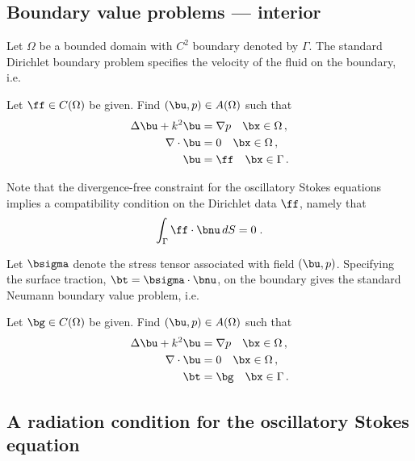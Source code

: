 \subsection{Boundary value problems --- interior}

Let $\Omega$ be a bounded domain with $C^2$ boundary
denoted by $\Gamma$.
The standard Dirichlet boundary problem specifies the
velocity of the fluid on the boundary, i.e.

\begin{definition}
  Let $\ff \in C(\Omega)$ be given. Find $(\bu,p) \in A(\Omega)$
  such that
  \begin{equation}
  \begin{aligned} \label{eq:dir_interior}
    \Delta \bu + k^{2} \bu &= \nabla p \quad \bx \in \Omega \, ,\\
    \nabla \cdot \bu &= 0 \quad \bx \in \Omega \, ,  \\
    \bu &= \ff \quad \bx \in \Gamma \, .
  \end{aligned}
  \end{equation}
\end{definition}
Note that the divergence-free constraint for the oscillatory
Stokes equations implies a compatibility condition on the
Dirichlet data $\ff$, namely that
\begin{equation} \label{eq:dir_compat}
  \int_\Gamma \ff \cdot \bnu \, dS = 0 \; .
\end{equation}


Let $\bsigma$ denote the stress tensor associated with
field $(\bu,p)$. 
Specifying the surface traction, $\bt = \bsigma \cdot \bnu$,
on the boundary gives the standard Neumann boundary value
problem, i.e.

\begin{definition}
  Let $\bg \in C(\Omega)$ be given. Find $(\bu,p) \in A(\Omega)$
  such that
  \begin{equation}
  \begin{aligned} \label{eq:neu_interior}
    \Delta \bu + k^{2} \bu &= \nabla p \quad \bx \in \Omega \, ,\\
    \nabla \cdot \bu &= 0 \quad \bx \in \Omega \, ,  \\
    \bt &= \bg \quad \bx \in \Gamma \, .
  \end{aligned}
  \end{equation}
\end{definition}

\subsection{A radiation condition for the oscillatory Stokes
  equation}

